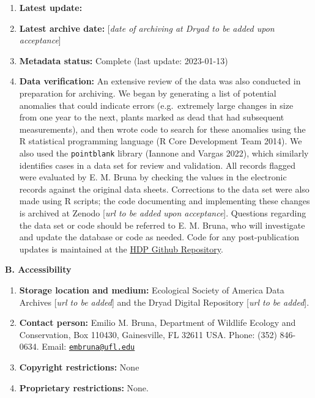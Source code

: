 \documentclass[
  12pt,
  man, donotrepeattitle,floatsintext]{apa6}
\begin{document}
\begin{enumerate}
\def\labelenumi{\arabic{enumi}.}
\item
  \textbf{Latest update:}
\item
  \textbf{Latest archive date:} {[}\emph{date of archiving at Dryad to be added upon acceptance}{]}
\item
  \textbf{Metadata status:} Complete (last update:
  2023-01-13)
\item
  \textbf{Data verification:} An extensive review of the data was also conducted in preparation for archiving. We began by generating a list of potential anomalies that could indicate errors (e.g.~extremely large changes in size from one year to the next, plants marked as dead that had subsequent measurements), and then wrote code to search for these anomalies using the R statistical programming language (R Core Development Team 2014). We also used the \texttt{pointblank} library (Iannone and Vargas 2022), which similarly identifies cases in a data set for review and validation. All records flagged were evaluated by E. M. Bruna by checking the values in the electronic records against the original data sheets. Corrections to the data set were also made using R scripts; the code documenting and implementing these changes is archived at Zenodo {[}\emph{url to be added upon acceptance}{]}. Questions regarding the data set or code should be referred to E. M. Bruna, who will investigate and update the database or code as needed. Code for any post-publication updates is maintained at the \href{https://github.com/BrunaLab/HeliconiaSurveys}{HDP Github Repository}.
\end{enumerate}

\noindent 
\textbf{B. Accessibility}

\begin{enumerate}
\def\labelenumi{\arabic{enumi}.}
\item
  \textbf{Storage location and medium:} Ecological Society of America Data Archives {[}\emph{url to be added}{]} and the Dryad Digital Repository {[}\emph{url to be added}{]}.
\item
  \textbf{Contact person:} Emilio M. Bruna, Department of Wildlife Ecology and Conservation, Box 110430, Gainesville, FL 32611 USA. Phone: (352) 846-0634. Email: \href{mailto:embruna@ufl.edu}{\nolinkurl{embruna@ufl.edu}}
\item
  \textbf{Copyright restrictions:} None
\item
  \textbf{Proprietary restrictions:} None.
\end{enumerate}
\end{document}
